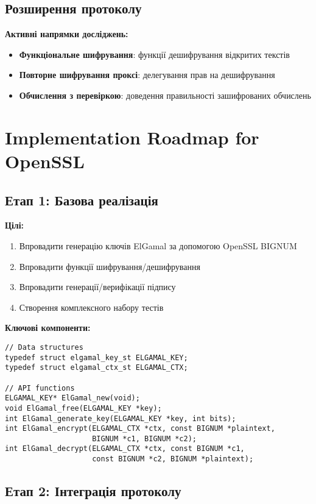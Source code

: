\subsection{Розширення протоколу}

\textbf{Активні напрямки досліджень:}
\begin{itemize}
    \item \textbf{Функціональне шифрування}: функції дешифрування відкритих текстів
    \item \textbf{Повторне шифрування проксі}: делегування прав на дешифрування
    \item \textbf{Обчислення з перевіркою}: доведення правильності зашифрованих обчислень
\end{itemize}

\section{Implementation Roadmap for OpenSSL}

\subsection{Етап 1: Базова реалізація}

\textbf{Цілі:}
\begin{enumerate}
    \item Впровадити генерацію ключів ElGamal за допомогою OpenSSL BIGNUM
    \item Впровадити функції шифрування/дешифрування
    \item Впровадити генерації/верифікації підпису
    \item Створення комплексного набору тестів
\end{enumerate}

\newpage %

\textbf{Ключові компоненти:}
\begin{verbatim}
// Data structures
typedef struct elgamal_key_st ELGAMAL_KEY;
typedef struct elgamal_ctx_st ELGAMAL_CTX;

// API functions
ELGAMAL_KEY* ElGamal_new(void);
void ElGamal_free(ELGAMAL_KEY *key);
int ElGamal_generate_key(ELGAMAL_KEY *key, int bits);
int ElGamal_encrypt(ELGAMAL_CTX *ctx, const BIGNUM *plaintext,
                    BIGNUM *c1, BIGNUM *c2);
int ElGamal_decrypt(ELGAMAL_CTX *ctx, const BIGNUM *c1,
                    const BIGNUM *c2, BIGNUM *plaintext);
\end{verbatim}

\subsection{Етап 2: Інтеграція протоколу}

